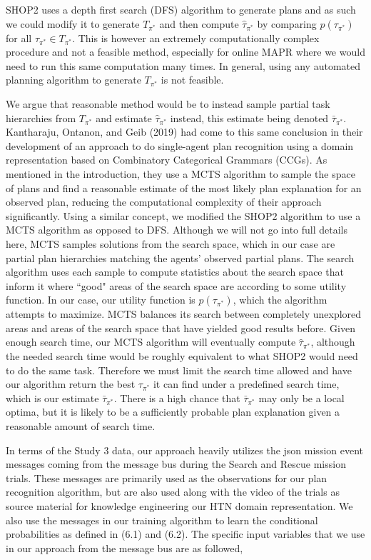 SHOP2 uses a depth first search (DFS) algorithm to generate plans and as such we could modify it to generate $T_{\pi^*}$ and then compute $\hat{\tau}_{\pi^*}$ by comparing $p(\tau_{\pi^*})$ for all $\tau_{\pi^*} \in T_{\pi^*}$. This is however an extremely computationally complex procedure and not a feasible method, especially for online MAPR where we would need to run this same computation many times. In general, using any automated planning algorithm to generate $T_{\pi^*}$ is not feasible. 

We argue that reasonable method would be to instead sample partial task hierarchies from $T_{\pi^*}$ and estimate $\hat{\tau}_{\pi^*}$ instead, this estimate being denoted $\bar{\tau}_{\pi^*}$. Kantharaju, Ontanon, and Geib (2019) had come to this same conclusion in their development of an approach to do single-agent plan recognition using a domain representation based on Combinatory Categorical Grammars (CCGs). As mentioned in the introduction, they use a MCTS algorithm to sample the space of plans and find a reasonable estimate of the most likely plan explanation for an observed plan, reducing the computational complexity of their approach significantly. Using a similar concept, we modified the SHOP2 algorithm to use a MCTS algorithm as opposed to DFS. Although we will not go into full details here, MCTS samples solutions from the search space, which in our case are partial plan hierarchies matching the agents' observed partial plans. The search algorithm uses each sample to compute statistics about the search space that inform it where ``good" areas of the search space are according to some utility function. In our case, our utility function is $p(\tau_{\pi^*})$, which the algorithm attempts to maximize. MCTS balances its search between completely unexplored areas and areas of the search space that have yielded good results before. Given enough search time, our MCTS algorithm will eventually compute $\hat{\tau}_{\pi^*}$, although the needed search time would be roughly equivalent to what SHOP2 would need to do the same task. Therefore we must limit the search time allowed and have our algorithm return the best $\tau_{\pi^*}$ it can find under a predefined search time, which is our estimate $\bar{\tau}_{\pi^*}$. There is a high chance that $\bar{\tau}_{\pi^*}$ may only be a local optima, but it is likely to be a sufficiently probable plan explanation given a reasonable amount of search time. 

In terms of the Study 3 data, our approach heavily utilizes the json mission event messages coming from the message bus during the Search and Rescue mission trials. These messages are primarily used as the observations for our plan recognition algorithm, but are also used along with the video of the trials as source material for knowledge engineering our HTN domain representation. We also use the messages in our training algorithm to learn the conditional probabilities as defined in (6.1) and (6.2). The specific input variables that we use in our approach from the message bus are as followed, 

